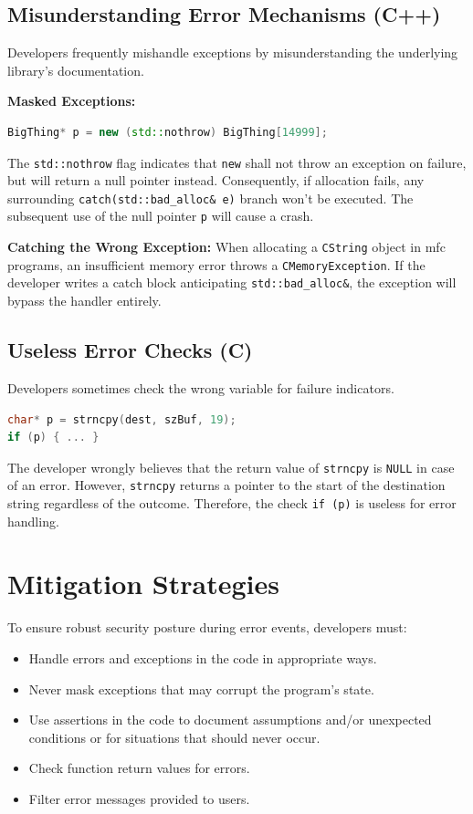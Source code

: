 \subsection{Misunderstanding  Error Mechanisms (C++)}
Developers frequently mishandle exceptions by misunderstanding the underlying library's documentation. 

\textbf{Masked Exceptions:}
\begin{lstlisting}[language=C++]
BigThing* p = new (std::nothrow) BigThing[14999];
\end{lstlisting}
The \texttt{std::nothrow} flag indicates that \texttt{new} shall not throw an exception on failure, but will return a null pointer instead. Consequently, if allocation fails, any surrounding \texttt{catch(std::bad\_alloc\& e)} branch won't be executed. The subsequent use of the null pointer \texttt{p} will cause a crash.

\textbf{Catching the Wrong Exception:}
When allocating a \texttt{CString} object in \gls{mfc} programs, an insufficient memory error throws a \texttt{CMemoryException}. If the developer writes a catch block anticipating \texttt{std::bad\_alloc\&}, the exception will bypass the handler entirely.

\subsection{Useless Error Checks (C)}
Developers sometimes check the wrong variable for failure indicators.
\begin{lstlisting}[language=C]
char* p = strncpy(dest, szBuf, 19);
if (p) { ... }
\end{lstlisting}
The developer wrongly believes that the return value of \texttt{strncpy} is \texttt{NULL} in case of an error. However, \texttt{strncpy} returns a pointer to the start of the destination string regardless of the outcome. Therefore, the check \texttt{if (p)} is useless for error handling.

\section{Mitigation Strategies}
To ensure robust security posture during error events, developers must:
\begin{itemize}
    \item Handle errors and exceptions in the code in appropriate ways.
    \item Never mask exceptions that may corrupt the program's state.
    \item Use assertions in the code to document assumptions and/or unexpected conditions or for situations that should never occur.
    \item Check function return values for errors.
    \item Filter error messages provided to users.
\end{itemize}

